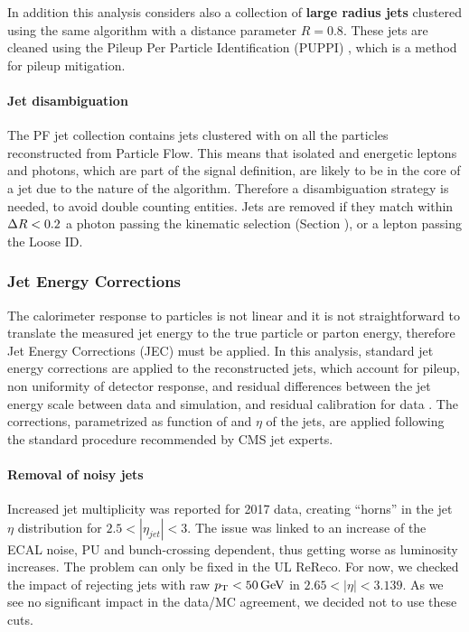 In addition this analysis considers also a collection of \textbf{large radius jets} clustered using the same \antikt algorithm with a distance parameter $R = 0.8$.
These jets are cleaned using the Pileup Per Particle Identification (PUPPI) \cite{Bertolini_2014}, which is a method for pileup mitigation.

\paragraph{Jet disambiguation\\}
The PF jet collection contains jets clustered with \antikt on all the particles reconstructed from Particle Flow.
This means that isolated and energetic leptons and photons, which are part of the signal definition,
are likely to be in the core of a jet due to the nature of the algorithm.
Therefore a disambiguation strategy is needed, to avoid double counting entities.
Jets are removed if they match within $\Delta R < 0.2$ a photon passing the kinematic selection (Section ),
or a lepton passing the Loose ID.

\subsubsection{Jet Energy Corrections}

The calorimeter response to particles is not linear and it is not straightforward to translate the measured jet energy
to the true particle or parton energy, therefore Jet Energy Corrections (JEC) must be applied.
In this analysis, standard jet energy corrections are applied to the reconstructed jets, which account for pileup,
non uniformity of detector response, and residual differences between the jet energy scale between data and simulation, and residual calibration for data
\cite{CMS:JEC_2011, CMS-DP-2016-020, CMS-DP-2021-033}.
The corrections, parametrized as function of \pt and $\eta$ of the jets, are applied following the standard procedure recommended by CMS jet experts.

\paragraph{Removal of noisy jets\\}
Increased jet multiplicity was reported for 2017 data, creating ``horns'' in the jet $\eta$ distribution for $2.5<|\eta_{jet}|<3$.
The issue was linked to an increase of the ECAL noise, PU and bunch-crossing dependent, thus getting worse as luminosity increases.
The problem can only be fixed in the UL ReReco.
For now, we checked the impact of rejecting jets with raw $p_{\mathrm{T}} < 50 \,\text{Ge\hspace{-.08em}V}$ in $2.65 <|\eta| < 3.139$.
As we see no significant impact in the data/MC agreement, we decided not to use these cuts.

